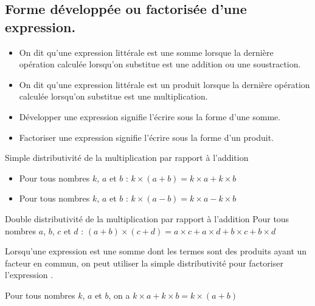 \begin{pageCours} %


\section{Forme développée ou factorisée d'une expression.}

\begin{Def}
\begin{itemize}
\item On dit qu'une expression littérale est une somme lorsque la dernière opération calculée lorsqu'on substitue est une addition ou une soustraction.
\item On dit qu'une expression littérale est un produit lorsque la dernière opération calculée lorsqu'on substitue est une multiplication.
\end{itemize}
\end{Def}

\begin{Def}
\begin{itemize}
\item Développer une expression signifie l'écrire sous la forme d'une somme.
\item Factoriser une expression signifie l'écrire sous la forme d'un produit.
\end{itemize}
\end{Def}

\begin{PpT}{Simple distributivité de la multiplication par rapport à l'addition}
\begin{itemize}
\item Pour tous nombres $k$, $a$ et $b$ : $k\times(a+b)=k\times a+k\times b$
\item Pour tous nombres $k$, $a$ et $b$ : $k\times(a-b)=k\times a-k\times b$
\end{itemize}
\end{PpT}

\begin{PpT}{Double distributivité de la multiplication par rapport à l'addition}
Pour tous nombres $a$, $b$, $c$ et $d$ : $(a+b)\times(c+d)=a\times c+a\times d+b\times c+b\times d$
\end{PpT}

\begin{Rq}
Lorsqu'une expression est une somme dont les termes sont des produits ayant un facteur en commun, on peut utiliser la simple distributivité pour factoriser l'expression .

Pour tous nombres $k$, $a$ et $b$, on a $k\times a+k\times b=k\times (a+b)$
\end{Rq}

\end{pageCours} %

